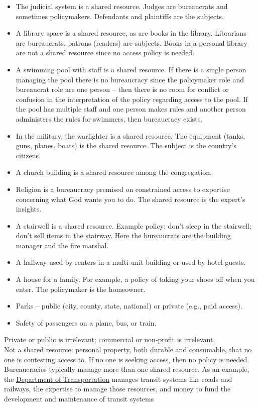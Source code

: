{{\begin{itemize}
\item The judicial system is a shared resource. Judges are bureaucrats and sometimes policymakers. Defendants and plaintiffs are the subjects. 
\item A library space is a shared resource, as are books in the library. Librarians are bureaucrats, patrons (readers) are subjects. Books in a personal library are not a shared resource since no access policy is needed.
\item A swimming pool with staff is a shared resource. If there is a single person managing the pool there is no bureaucracy since the \gls{policymaker} role and bureaucrat role are one person -- then there is no room for conflict or confusion in the interpretation of the policy regarding access to the pool. If the pool has multiple staff and one person makes rules and another person administers the rules for swimmers, then bureaucracy exists.
\item In the military, the warfighter is a shared resource. The equipment (tanks, guns, planes, boats) is the shared resource. The subject is the country's citizens. 
\item A church building is a shared resource among the congregation.
\item Religion is a bureaucracy premised on constrained access to expertise concerning what God wants you to do. The shared resource is the expert's insights.
\item A stairwell is a shared resource. Example policy: don't sleep in the stairwell; don't sell items in the stairway. Here the bureaucrats are the building manager and the fire marshal. 
\item A hallway used by renters in a multi-unit building or used by hotel guests.
\item A house for a family. For example, a policy of taking your shoes off when you enter. The policymaker is the homeowner.
\item Parks -- public (city, county, state, national) or private (e.g., paid access). 
\item Safety of passengers on a plane, bus, or train. %
\end{itemize}
Private or public is irrelevant; commercial or non-profit is irrelevant. \\
Not a shared resource: personal property, both durable and consumable, that no one is contesting access to. If no one is seeking access, then no policy is needed. \\
Bureaucracies typically manage more than one shared resource.
As an example, the \href{https://en.wikipedia.org/wiki/Department_of_transportation}{Department of Transportation}
manages  transit systems like roads and railways, the expertise to manage those resources, and money to fund the development and maintenance of transit systems}
}

